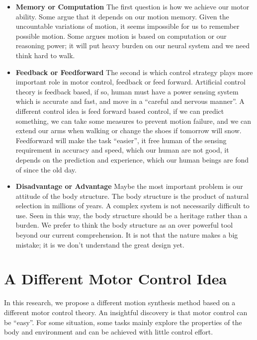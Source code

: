 \begin{itemize}
\item \textbf{ Memory or Computation}
The first question is how we achieve our motor ability. Some argue that it depends on our motion memory. Given the uncountable variations of motion, it seems impossible for us to remember possible motion. Some argues motion is based on computation or our reasoning power; it will put heavy burden on our neural system and we need think hard to walk.
	
\item \textbf{ Feedback or Feedforward}
The second is which control strategy plays more important role in motor control, feedback or feed forward. Artificial control theory is feedback based, if so, human must have a power sensing system which is accurate and fast, and move in a “careful and nervous manner”. 
A different control idea is feed forward based control, if we can predict something, we can take some measures to prevent motion failure, and we can extend our arms when walking or change the shoes if tomorrow will snow.
Feedforward will make the task “easier”, it free human of the sensing requirement in accuracy and speed, which our human are not good, it depends on the prediction and experience, which our human beings are fond of since the old day.
	
\item \textbf{Disadvantage or Advantage}
Maybe the most important problem is our attitude of the body structure. The body structure is the product of natural selection in millions of years. A complex system is not necessarily difficult to use. Seen in this way, the body structure should be a heritage rather than a burden.  We prefer to think the body structure as an over powerful tool beyond our current comprehension. 
It is not that the nature makes a big mistake; it is we don’t understand the great design yet.

\end{itemize}

\section{A Different Motor Control Idea}
In this research, we propose a different motion synthesis method based on a different motor control theory.
 An insightful discovery is that motor control can be “easy”.
For some situation, some tasks mainly explore the properties of the body and environment and can be achieved with little control effort.
 
